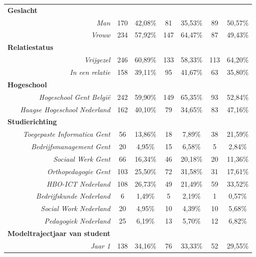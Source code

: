 \begin{landscape}
\begin{longtable}[c]{r|cccccc|}
		\multicolumn{1}{|l|}{\textbf{Geslacht}} &  &  &  &  &  &  \\
		\multicolumn{1}{|r|}{\textit{Man}} & 170 & 42,08\% & 81 & 35,53\% & 89 & 50,57\% \\
		\multicolumn{1}{|r|}{\textit{Vrouw}} & 234 & 57,92\% & 147 & 64,47\% & 87 & 49,43\% \\ \hline
		\multicolumn{1}{|l|}{\textbf{Relatiestatus}} &  &  &  &  &  &  \\
		\multicolumn{1}{|r|}{\textit{Vrijgezel}} & 246 & 60,89\% & 133 & 58,33\% & 113 & 64,20\% \\
		\multicolumn{1}{|r|}{\textit{In een relatie}} & 158 & 39,11\% & 95 & 41,67\% & 63 & 35,80\% \\ \hline
		\multicolumn{1}{|l|}{\textbf{Hogeschool}} &  &  &  &  &  &  \\
		\multicolumn{1}{|r|}{\textit{Hogeschool Gent België}} & 242 & 59,90\% & 149 & 65,35\% & 93 & 52,84\% \\
		\multicolumn{1}{|r|}{\textit{Haagse Hogeschool Nederland}} & 162 & 40,10\% & 79 & 34,65\% & 83 & 47,16\% \\ \hline
		\multicolumn{1}{|l|}{\textbf{Studierichting}} &  &  &  &  &  &  \\
		\multicolumn{1}{|r|}{\textit{Toegepaste Informatica Gent}} & 56 & 13,86\% & 18 & 7,89\% & 38 & 21,59\% \\
		\multicolumn{1}{|r|}{\textit{Bedrijfsmanagement Gent}} & 20 & 4,95\% & 15 & 6,58\% & 5 & 2,84\% \\
		\multicolumn{1}{|r|}{\textit{Sociaal Werk Gent}} & 66 & 16,34\% & 46 & 20,18\% & 20 & 11,36\% \\
		\multicolumn{1}{|r|}{\textit{Orthopedagogie Gent}} & 103 & 25,50\% & 72 & 31,58\% & 31 & 17,61\% \\
		\multicolumn{1}{|r|}{\textit{HBO-ICT Nederland}} & 108 & 26,73\% & 49 & 21,49\% & 59 & 33,52\% \\
		\multicolumn{1}{|r|}{\textit{Bedrijfskunde Nederland}} & 6 & 1,49\% & 5 & 2,19\% & 1 & 0,57\% \\
		\multicolumn{1}{|r|}{\textit{Social Work Nederland}} & 20 & 4,95\% & 10 & 4,39\% & 10 & 5,68\% \\
		\multicolumn{1}{|r|}{\textit{Pedagogiek Nederland}} & 25 & 6,19\% & 13 & 5,70\% & 12 & 6,82\% \\ \hline
		\multicolumn{1}{|l|}{\textbf{Modeltrajectjaar van student}} &  &  &  &  &  &  \\
		\multicolumn{1}{|r|}{\textit{Jaar 1}} & 138 & 34,16\% & 76 & 33,33\% & 52 & 29,55\% \\

\end{longtable}
\end{landscape}
